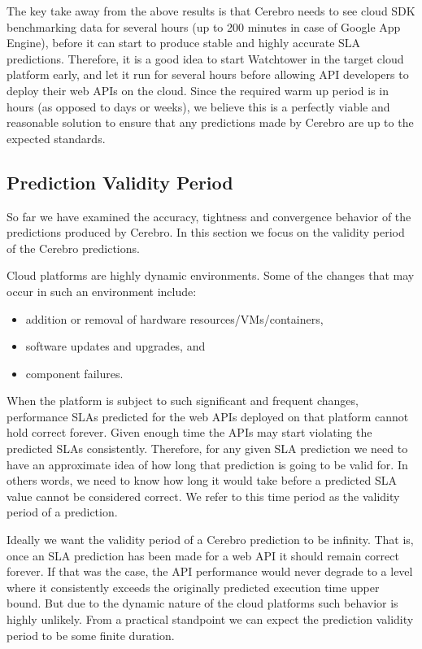 The key take away from the above results is that Cerebro needs to see cloud SDK benchmarking data for several hours (up to 200 minutes in case of 
Google App Engine), before it can start to produce stable and highly accurate SLA predictions. Therefore, it is a good idea to start Watchtower in the
target cloud platform early, and let it run for several hours before allowing API developers to deploy their web APIs on the cloud. Since the
required warm up period is in hours (as opposed to days or weeks), we believe this is a perfectly viable and reasonable solution to
ensure that any predictions made by Cerebro are up to the expected standards.

\subsection{Prediction Validity Period}
So far we have examined the accuracy, tightness and convergence behavior of the predictions produced by Cerebro. In this section we 
focus on the validity period of the Cerebro predictions.

Cloud platforms are highly dynamic environments. Some of the changes that may occur in such an environment include:
\begin{itemize}
\item addition or removal of hardware resources/VMs/containers,
\item software updates and upgrades, and
\item component failures.
\end{itemize}

When the platform is subject to such significant and frequent changes, performance SLAs predicted for the web APIs deployed on that
platform cannot hold correct forever. Given enough time the APIs may start violating the predicted SLAs consistently. Therefore, for any
given SLA prediction we need to have an approximate idea of how long that prediction is going to be valid for. In others words, we need
to know how long it would take before a predicted SLA value cannot be considered correct. We refer to this time period as the validity
period of a prediction.

Ideally we want the validity period of a Cerebro prediction to be infinity. That is, once an SLA prediction has been made for a web API it
should remain correct forever. If that was the case, the API performance would never degrade to a level where it
consistently exceeds the originally predicted execution time upper bound. But due to the dynamic nature of the cloud platforms such
behavior is highly unlikely. From a practical standpoint we can expect the prediction validity period to be some finite duration. 

